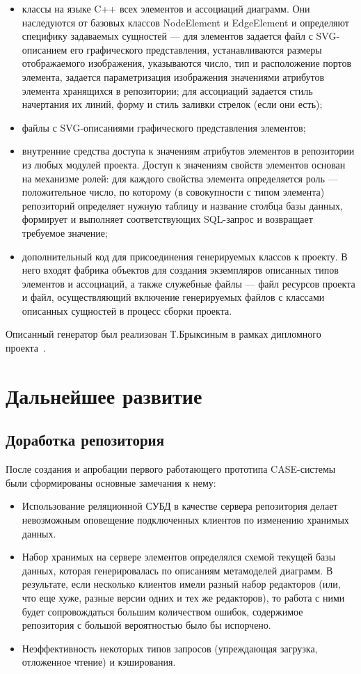 \documentclass[a5paper]{article}
\begin{document}
\begin{itemize}
  \item классы на языке C++ всех элементов и
	ассоциаций диаграмм. Они наследуются от базовых классов
	NodeElement и EdgeElement и определяют специфику
	задаваемых сущностей --- для элементов задается файл с
	SVG-описанием его графического
	представления, устанавливаются размеры отображаемого изображения,
	указываются число, тип и расположение портов элемента, задается
	параметризация изображения значениями атрибутов элемента хранящихся в
	репозитории; для ассоциаций задается стиль начертания их линий, форму и
	стиль заливки стрелок (если они есть);
  \item файлы с SVG-описаниями графического представления элементов;
  \item внутренние средства доступа к значениям атрибутов элементов в
	репозитории из любых модулей проекта. Доступ к значениям свойств
	элементов основан на механизме ролей: для каждого свойства элемента
	определяется роль --- положительное число, по которому (в совокупности
	с типом элемента) репозиторий определяет нужную таблицу и название
	столбца базы данных, формирует и выполняет соответствующих
	SQL-запрос и возвращает требуемое значение;
  \item дополнительный код для присоединения генерируемых классов к проекту. В
	него входят фабрика объектов для создания экземпляров описанных типов
	элементов и ассоциаций, а также служебные файлы --- файл ресурсов проекта
	и файл, осуществляющий включение генерируемых файлов с классами
	описанных сущностей в процесс сборки проекта.
\end{itemize}

Описанный генератор был реализован Т.Брыксиным в рамках дипломного
проекта~\cite{bryksin}.

\section{Дальнейшее развитие}
\subsection{Доработка репозитория}

После создания и апробации первого работающего прототипа
CASE-системы были сформированы основные замечания к нему:

\begin{itemize}
  \item Использование реляционной СУБД в качестве сервера репозитория делает
	невозможным оповещение подключенных клиентов по изменению хранимых
	данных.
  \item Набор хранимых на сервере элементов определялся схемой текущей базы
	данных, которая генерировалась по описаниям метамоделей диаграмм. В
	результате, если несколько клиентов имели разный набор редакторов (или,
	что еще хуже, разные версии одних и тех же редакторов), то работа с
	ними будет сопровождаться большим количеством ошибок, содержимое
	репозитория с большой вероятностью было бы испорчено.
  \item Неэффективность некоторых типов запросов (упреждающая загрузка,
	отложенное чтение) и кэширования.
\end{itemize}
\end{document}

